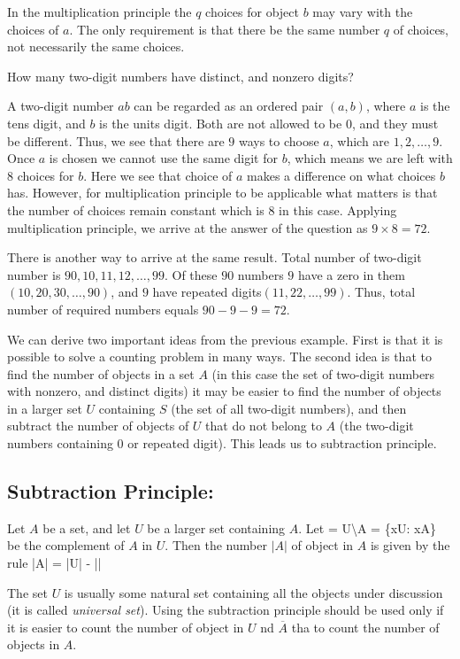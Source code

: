 In the multiplication principle the $q$ choices for object $b$ may vary with the choices of $a$. The only requirement is that there
be the same number $q$ of choices, not necessarily the same choices.

 How many two-digit numbers have distinct, and nonzero digits?

A two-digit number $ab$ can be regarded as an ordered pair $(a, b)$, where $a$ is the tens digit, and $b$ is the units digit. Both
are not allowed to be $0$, and they must be different. Thus, we see that there are $9$ ways to choose $a$, which are $1, 2, \ldots,
9$. Once $a$ is chosen we cannot use the same digit for $b$, which means we are left with $8$ choices for $b$. Here we see that
choice of $a$ makes a difference on what choices $b$ has. However, for multiplication principle to be applicable what matters is
that the number of choices remain constant which is $8$ in this case. Applying multiplication principle, we arrive at the answer of
the question as $9\times8 = 72$.

There is another way to arrive at the same result. Total number of two-digit number is $90, 10,11, 12, \ldots, 99$. Of these $90$
numbers $9$ have a zero in them$(10, 20, 30, \ldots, 90)$, and $9$ have repeated digits$(11, 22, \ldots, 99)$. Thus, total number of
required numbers equals $90 - 9 - 9 = 72$.

We can derive two important ideas from the previous example. First is that it is possible to solve a counting problem in many
ways. The second idea is that to find the number of objects in a set $A$ (in this case the set of two-digit numbers with nonzero,
and distinct digits) it may be easier to find the number of objects in a larger set $U$ containing $S$ (the set of all
two-digit numbers), and then subtract the number of objects of $U$ that do not belong to $A$ (the two-digit numbers containing $0$
or repeated digit). This leads us to subtraction principle.

\subsection{Subtraction Principle:}
Let $A$ be a set, and let $U$ be a larger set containing $A$. Let
\startformula {} = U\textbackslash A = \{x\in U: x\notin A\}\stopformula
be the complement of $A$ in $U$. Then the number $|A|$ of object in $A$ is given by the rule
\startformula |A| = |U| - ||\stopformula

The set $U$ is usually some natural set containing all the objects under discussion (it is called {\it universal set}). Using
the subtraction principle should be used only if it is easier to count the number of object in $U$ nd $\overline{A}$ tha to count the
number of objects in $A$.

